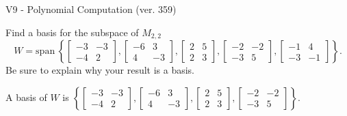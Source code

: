 \begin{exercise}
  \begin{exerciseTitle}V9 - Polynomial Computation (ver. 359)\end{exerciseTitle}
  \begin{exerciseStatement}
    Find a basis for the subspace of \(M_{2,2}\) 
\[W=\mathrm{span}\ \left\{\left[\begin{array}{cc}
-3 & -3 \\
-4 & 2
\end{array}\right] , \left[\begin{array}{cc}
-6 & 3 \\
4 & -3
\end{array}\right] , \left[\begin{array}{cc}
2 & 5 \\
2 & 3
\end{array}\right] , \left[\begin{array}{cc}
-2 & -2 \\
-3 & 5
\end{array}\right] , \left[\begin{array}{cc}
-1 & 4 \\
-3 & -1
\end{array}\right]\right\}.\]
 Be sure to explain why your result is a basis.


  \end{exerciseStatement}
  \begin{exerciseAnswer}
   A basis of \(W\) is  \(\left\{\left[\begin{array}{cc}
-3 & -3 \\
-4 & 2
\end{array}\right] , \left[\begin{array}{cc}
-6 & 3 \\
4 & -3
\end{array}\right] , \left[\begin{array}{cc}
2 & 5 \\
2 & 3
\end{array}\right] , \left[\begin{array}{cc}
-2 & -2 \\
-3 & 5
\end{array}\right]\right\}\).
  


  \end{exerciseAnswer}
\end{exercise}